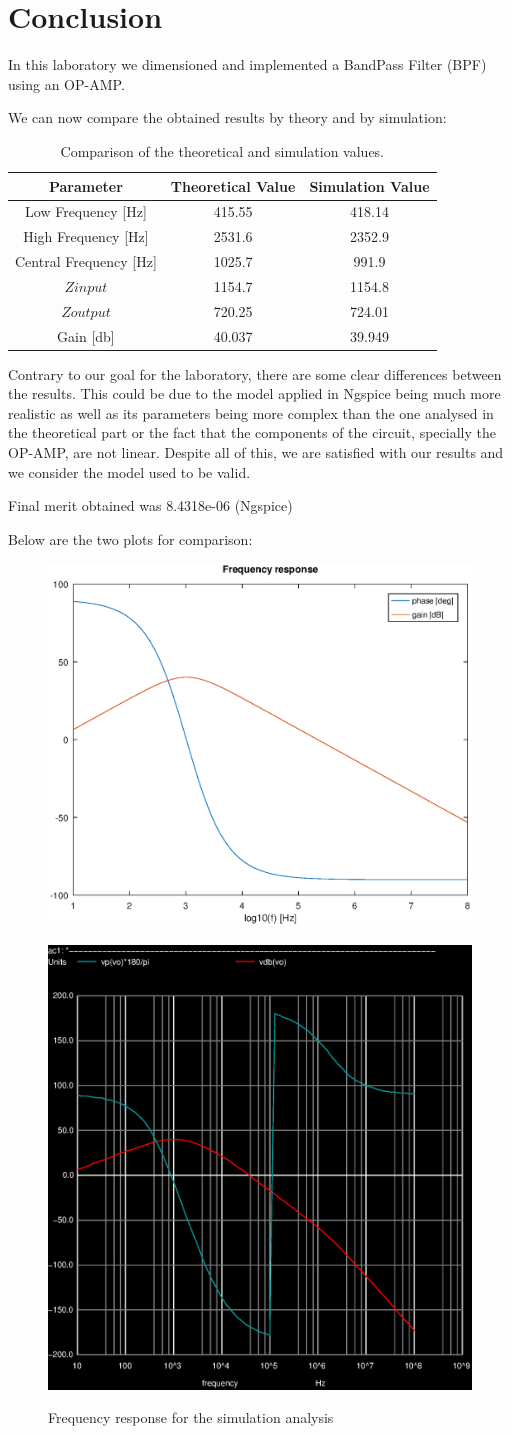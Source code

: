 \newpage
\section{Conclusion}
\label{sec:conclusion}

In this laboratory we dimensioned and implemented a BandPass Filter (BPF) using an OP-AMP.

We can now compare the obtained results by theory and by simulation:

\begin{table}[h]
    \centering
    \begin{tabular}{|c|c|c|}
    \hline
    {\bf Parameter} & {\bf Theoretical Value}& {\bf Simulation Value}\\
    \hline\hline
     Low Frequency [Hz] & 415.55 & 418.14\\
    \hline
    High Frequency [Hz] & 2531.6 & 2352.9\\
    \hline
   Central Frequency [Hz] & 1025.7 & 991.9\\
   \hline
     $Z{input}$ & 1154.7 & 1154.8 \\
    \hline
     $Z{output}$ & 720.25 & 724.01\\
    \hline
      Gain [db] & 40.037 & 39.949\\
    \hline
    \end{tabular}
    \caption{Comparison of the theoretical and simulation values.}
    \label{tab:values}
\end{table}

Contrary to our goal for the laboratory, there are some clear differences between the results. This could be due to the model applied in Ngspice being much more realistic as well as its parameters being more complex than the one analysed in the theoretical part or the fact that the components of the circuit, specially the OP-AMP, are not linear. 
Despite all of this, we are satisfied with our results and we consider the model used to be valid.


Final merit obtained was 8.4318e-06 (Ngspice)

Below are the two plots for comparison:

\begin{figure}[!ht] \centering
\caption{Frequency response $V_o$(f)/$V_i$(f)}
\includegraphics[width=0.4\linewidth]{theory.eps}
\caption{Frequency response for the simulation analysis}
\includegraphics[width=0.4\linewidth]{simulation.eps}
\label{fig:theoretical}
\end{figure}
